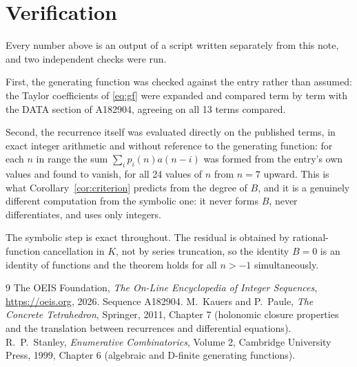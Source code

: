 \documentclass[11pt,a4paper]{article}
\theoremstyle{plain}
\theoremstyle{definition}
\begin{document}
\section{Verification}

Every number above is an output of a script written separately from this note, and two
independent checks were run.

First, the generating function was checked against the entry rather than assumed: the
Taylor coefficients of \eqref{eq:gf} were expanded and compared term by term with the DATA
section of A182904, agreeing on all 13 terms compared.

Second, the recurrence itself was evaluated directly on the published terms, in exact
integer arithmetic and without reference to the generating function: for each $n$ in range
the sum $\sum_{i}p_{i}(n)a(n-i)$ was formed from the entry's own values and found to
vanish, for all 24 values of $n$ from $n=7$ upward. This is what
Corollary~\ref{cor:criterion} predicts from the degree of $B$, and it is a genuinely
different computation from the symbolic one: it never forms $B$, never differentiates, and
uses only integers.

The symbolic step is exact throughout. The residual is obtained by rational-function
cancellation in $K$, not by series truncation, so the identity $B=0$ is an
identity of functions and the theorem holds for all $n>-1$ simultaneously.

\begin{thebibliography}{9}
 The OEIS Foundation, \emph{The On-Line Encyclopedia of Integer Sequences},
\url{https://oeis.org}, 2026. Sequence A182904.
 M.~Kauers and P.~Paule, \emph{The Concrete Tetrahedron}, Springer, 2011,
Chapter 7 (holonomic closure properties and the translation between recurrences and
differential equations).
 R.~P.~Stanley, \emph{Enumerative Combinatorics}, Volume 2, Cambridge
University Press, 1999, Chapter 6 (algebraic and D-finite generating functions).
\end{thebibliography}
\end{document}

